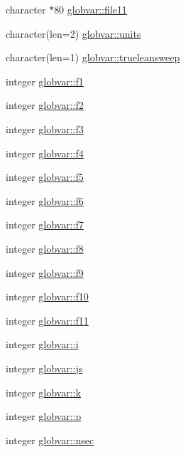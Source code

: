 \begin{DoxyCompactItemize}
\item 
character $\ast$80 \hyperlink{namespaceglobvar_a8150c7754f44712fdeb69767f63ac557}{globvar\+::file11}
\item 
character(len=2) \hyperlink{namespaceglobvar_a5a48d5b0df94151f6ccff35f89d832ed}{globvar\+::units}
\item 
character(len=1) \hyperlink{namespaceglobvar_a113718364777f5700503cc4655ea8a36}{globvar\+::trueleansweep}
\item 
integer \hyperlink{namespaceglobvar_ad587987756a26ab8482d669091aa11e2}{globvar\+::f1}
\item 
integer \hyperlink{namespaceglobvar_ab013958d5d057b8aca4e06ba0daa8406}{globvar\+::f2}
\item 
integer \hyperlink{namespaceglobvar_a22ec31cd077818915aa449475242ebc1}{globvar\+::f3}
\item 
integer \hyperlink{namespaceglobvar_ac3c062c849a3ecf6de129ae085a265ae}{globvar\+::f4}
\item 
integer \hyperlink{namespaceglobvar_aef4e41982e8eb0e0436d5261df60a5ba}{globvar\+::f5}
\item 
integer \hyperlink{namespaceglobvar_a9bcf733cb3d2746a17a750550de00730}{globvar\+::f6}
\item 
integer \hyperlink{namespaceglobvar_ad5518ff994222c6d414b1ab14ec5ff3b}{globvar\+::f7}
\item 
integer \hyperlink{namespaceglobvar_a81a49408c447c53cabc16ec197a0520f}{globvar\+::f8}
\item 
integer \hyperlink{namespaceglobvar_ae5c9f355184c5007c6fd6e3e77ff5006}{globvar\+::f9}
\item 
integer \hyperlink{namespaceglobvar_a31893a074cdc83965ae93c821376be2b}{globvar\+::f10}
\item 
integer \hyperlink{namespaceglobvar_a8107e26d71f5d153179d812a2060f289}{globvar\+::f11}
\item 
integer \hyperlink{namespaceglobvar_a9b05c54fac739f587c870e529b2216f9}{globvar\+::i}
\item 
integer \hyperlink{namespaceglobvar_a0f5c9c2384e0fd1c79c5e07df615661f}{globvar\+::js}
\item 
integer \hyperlink{namespaceglobvar_ac3085057e6f2d3302a5046006457c547}{globvar\+::k}
\item 
integer \hyperlink{namespaceglobvar_ae7c4dc9c253893de2f413b45f223f1a9}{globvar\+::p}
\item 
integer \hyperlink{namespaceglobvar_a4bcc489e884542bc5eb30f17d5773278}{globvar\+::nsec}
\item 

\end{DoxyCompactItemize}
